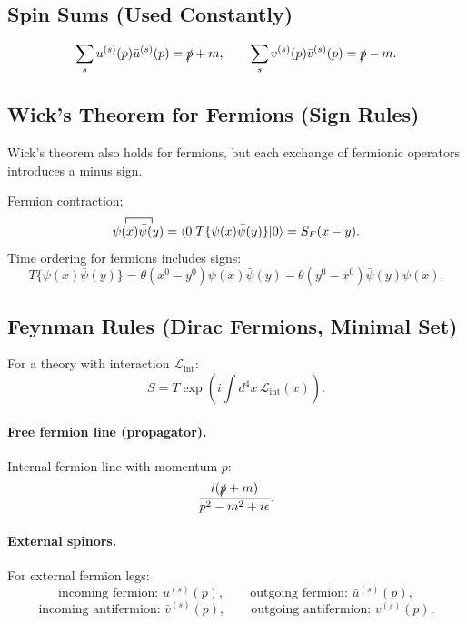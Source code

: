 \subsection{Spin Sums (Used Constantly)}
\begin{equation}
\sum_s u^{(s)}(p)\bar{u}^{(s)}(p)=\slashed{p}+m,
\qquad
\sum_s v^{(s)}(p)\bar{v}^{(s)}(p)=\slashed{p}-m.
\end{equation}

\subsection{Wick's Theorem for Fermions (Sign Rules)}
Wick's theorem also holds for fermions, but each exchange of fermionic operators introduces a minus sign.

Fermion contraction:
\begin{equation}
\contraction{}{\psi(x)}{}{\bar{\psi}(y)}\psi(x)\bar{\psi}(y)
=
\langle 0|T\{\psi(x)\bar{\psi}(y)\}|0\rangle
=
S_F(x-y).
\end{equation}
Time ordering for fermions includes signs:
\begin{equation}
T\{\psi(x)\bar{\psi}(y)\}
=
\theta(x^0-y^0)\psi(x)\bar{\psi}(y)
-\theta(y^0-x^0)\bar{\psi}(y)\psi(x).
\end{equation}

\subsection{Feynman Rules (Dirac Fermions, Minimal Set)}
For a theory with interaction $\mathcal{L}_{\mathrm{int}}$:
\begin{equation}
S=T\exp\left(i\int d^4x\,\mathcal{L}_{\mathrm{int}}(x)\right).
\end{equation}

\paragraph{Free fermion line (propagator).}
Internal fermion line with momentum $p$:
\begin{equation}
\frac{i(\slashed{p}+m)}{p^2-m^2+i\epsilon}.
\end{equation}

\paragraph{External spinors.}
For external fermion legs:
\begin{equation}
\text{incoming fermion: } u^{(s)}(p),
\qquad
\text{outgoing fermion: } \bar{u}^{(s)}(p),
\end{equation}
\begin{equation}
\text{incoming antifermion: } \bar{v}^{(s)}(p),
\qquad
\text{outgoing antifermion: } v^{(s)}(p).
\end{equation}

